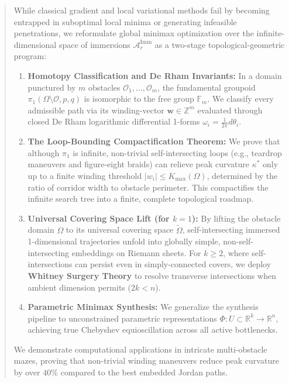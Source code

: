 \documentclass[11pt,reqno]{amsart}
\theoremstyle{definition}
\providecommand{\R}{\mathbb{R}}
\newcommand{\Cover}{\widetilde{\Omega}}
\numberwithin{equation}{section}
\providecommand{\R}{\mathbb{R}}
\begin{document}
\begin{abstract}
While classical gradient and local variational methods fail by becoming entrapped in suboptimal local minima or generating infeasible penetrations, we reformulate global minimax optimization over the infinite-dimensional space of immersions $\mathcal{A}_r^{\mathrm{Imm}}$ as a two-stage topological-geometric program:
\begin{enumerate}
    \item \textbf{Homotopy Classification and De Rham Invariants:} In a domain punctured by $m$ obstacles $\mathcal{O}_1, \dots, \mathcal{O}_m$, the fundamental groupoid $\pi_1(\Omega \setminus \mathcal{O}, p, q)$ is isomorphic to the free group $\mathbb{F}_m$. We classify every admissible path via its winding-vector $\mathbf{w} \in \mathbb{Z}^m$ evaluated through closed De Rham logarithmic differential 1-forms $\omega_i = \frac{1}{2\pi} d\theta_i$.
    \item \textbf{The Loop-Bounding Compactification Theorem:} We prove that although $\pi_1$ is infinite, non-trivial self-intersecting loops (e.g., teardrop maneuvers and figure-eight braids) can relieve peak curvature $\kappa^*$ only up to a finite winding threshold $|w_i| \le K_{\max}(\Omega)$, determined by the ratio of corridor width to obstacle perimeter. This compactifies the infinite search tree into a finite, complete topological roadmap.
    \item \textbf{Universal Covering Space Lift (for $k=1$):} By lifting the obstacle domain $\Omega$ to its universal covering space $\Cover$, self-intersecting immersed 1-dimensional trajectories unfold into globally simple, non-self-intersecting embeddings on Riemann sheets. For $k \ge 2$, where self-intersections can persist even in simply-connected covers, we deploy \textbf{Whitney Surgery Theory} to resolve transverse intersections when ambient dimension permits ($2k < n$).
    \item \textbf{Parametric Minimax Synthesis:} We generalize the synthesis pipeline to unconstrained parametric representations $\Phi: U \subset \R^k \to \R^n$, achieving true Chebyshev equioscillation across all active bottlenecks.
\end{enumerate}
We demonstrate computational applications in intricate multi-obstacle mazes, proving that non-trivial winding maneuvers reduce peak curvature by over $40\%$ compared to the best embedded Jordan paths.
\end{abstract}

\maketitle
\end{document}
